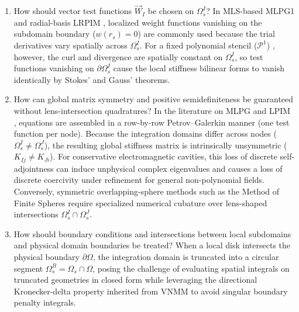 \documentclass[preprint,12pt]{elsarticle}
\begin{document}
\begin{enumerate}
    \item How should vector test functions $\vec{W}_I$ be chosen on $\Omega_s^I$? In MLS-based MLPG1 \cite{atluri1998new, atluri2002meshless} and radial-basis LRPIM \cite{liu2005introduction}, localized weight functions vanishing on the subdomain boundary ($w(r_s) = 0$) are commonly used because the trial derivatives vary spatially across $\Omega_s^I$. For a fixed polynomial stencil ($\mathcal{P}^1$) \cite{liu2001local, stable_vnmm2d_2026}, however, the curl and divergence are spatially constant on $\Omega_s^I$, so test functions vanishing on $\partial\Omega_s^I$ cause the local stiffness bilinear forms to vanish identically by Stokes' and Gauss' theorems.
    \item How can global matrix symmetry and positive semidefiniteness be guaranteed without lens-intersection quadratures? In the literature on MLPG \cite{atluri2002meshless, nicomedes2012meshless} and LPIM \cite{liu2001local, liu2005introduction}, equations are assembled in a row-by-row Petrov--Galerkin manner (one test function per node). Because the integration domains differ across nodes ($\Omega_s^I \ne \Omega_s^J$), the resulting global stiffness matrix is intrinsically unsymmetric ($K_{Ij} \ne K_{Ji}$). For conservative electromagnetic cavities, this loss of discrete self-adjointness can induce unphysical complex eigenvalues \cite{saad2011numerical, boffi2013mixed} and causes a loss of discrete coercivity under refinement for general non-polynomial fields. Conversely, symmetric overlapping-sphere methods such as the Method of Finite Spheres \cite{de2000method, nicomedes2021acoustic} require specialized numerical cubature over lens-shaped intersections $\Omega_s^I \cap \Omega_s^J$.
    \item How should boundary conditions and intersections between local subdomains and physical domain boundaries be treated? When a local disk intersects the physical boundary $\partial\Omega$, the integration domain is truncated into a circular segment $\Omega_s^B = \Omega_s \cap \Omega$, posing the challenge of evaluating spatial integrals on truncated geometries in closed form while leveraging the directional Kronecker-delta property inherited from VNMM \cite{ortiz2021nodal, goncalves2023vector, stable_vnmm2d_2026} to avoid singular boundary penalty integrals.

\end{enumerate}
\end{document}
